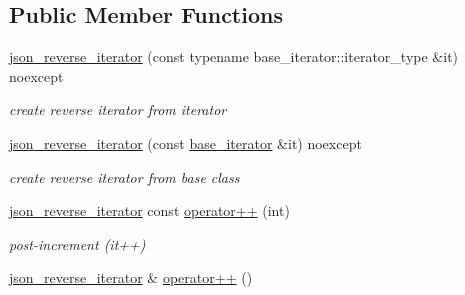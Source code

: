 \subsection*{Public Member Functions}
\begin{DoxyCompactItemize}
\item 
\hyperlink{classnlohmann_1_1detail_1_1json__reverse__iterator_a0246de16ece16293f2917dfa5d96e278}{json\+\_\+reverse\+\_\+iterator} (const typename base\+\_\+iterator\+::iterator\+\_\+type \&it) noexcept\hypertarget{classnlohmann_1_1detail_1_1json__reverse__iterator_a0246de16ece16293f2917dfa5d96e278}{}\label{classnlohmann_1_1detail_1_1json__reverse__iterator_a0246de16ece16293f2917dfa5d96e278}

\begin{DoxyCompactList}\small\item\em create reverse iterator from iterator \end{DoxyCompactList}\item 
\hyperlink{classnlohmann_1_1detail_1_1json__reverse__iterator_a6c2d025530114ed989188e8adfc8467e}{json\+\_\+reverse\+\_\+iterator} (const \hyperlink{classnlohmann_1_1detail_1_1json__reverse__iterator_a6b2ef1d632fe49bfcc22fbd1abd62395}{base\+\_\+iterator} \&it) noexcept\hypertarget{classnlohmann_1_1detail_1_1json__reverse__iterator_a6c2d025530114ed989188e8adfc8467e}{}\label{classnlohmann_1_1detail_1_1json__reverse__iterator_a6c2d025530114ed989188e8adfc8467e}

\begin{DoxyCompactList}\small\item\em create reverse iterator from base class \end{DoxyCompactList}\item 
\hyperlink{classnlohmann_1_1detail_1_1json__reverse__iterator}{json\+\_\+reverse\+\_\+iterator} const \hyperlink{classnlohmann_1_1detail_1_1json__reverse__iterator_aada9d2b320002ef870c5283cda2c1e9d}{operator++} (int)\hypertarget{classnlohmann_1_1detail_1_1json__reverse__iterator_aada9d2b320002ef870c5283cda2c1e9d}{}\label{classnlohmann_1_1detail_1_1json__reverse__iterator_aada9d2b320002ef870c5283cda2c1e9d}

\begin{DoxyCompactList}\small\item\em post-\/increment (it++) \end{DoxyCompactList}\item 
\hyperlink{classnlohmann_1_1detail_1_1json__reverse__iterator}{json\+\_\+reverse\+\_\+iterator} \& \hyperlink{classnlohmann_1_1detail_1_1json__reverse__iterator_a26caf0069a50ce4ecb010a1453e883fc}{operator++} ()\hypertarget{classnlohmann_1_1detail_1_1json__reverse__iterator_a26caf0069a50ce4ecb010a1453e883fc}{}\label{classnlohmann_1_1detail_1_1json__reverse__iterator_a26caf0069a50ce4ecb010a1453e883fc}


\end{DoxyCompactItemize}
